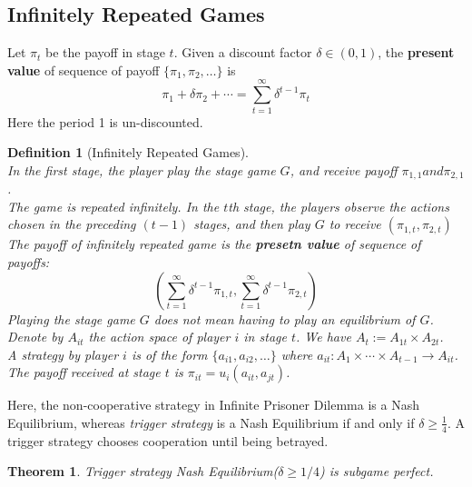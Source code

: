 \documentclass[12pt]{article}
\newtheorem{definition}{Definition}[section]
\newtheorem{theorem}{Theorem}[section]
\theoremstyle{definition}
\begin{document}
\subsection{Infinitely Repeated Games}
Let $\pi_t$ be the payoff in stage $t$. Given a discount factor $\delta\in (0,1)$, the \textbf{present value} of sequence of payoff $\{\pi_1,\pi_2,\ldots\}$ is
\[
\pi_1+\delta\pi_2+\cdots = \sum_{t=1}^\infty \delta^{t-1} \pi_t
\]
Here the period 1 is un-discounted.
\begin{definition}[Infinitely Repeated Games]
\hfill\\\normalfont In the first stage, the player play the stage game $G$, and receive payoff $\pi_{1,1} and \pi_{2,1}$.\\
The game is repeated infinitely. In the $t$th stage, the players observe the actions chosen in the preceding $(t-1)$ stages, and then play $G$ to receive $(\pi_{1,t}, \pi_{2,t})$\\
The payoff of infinitely repeated game is the \textbf{presetn value} of sequence of payoffs:
\[
(\sum_{t=1}^\infty \delta^{t-1}\pi_{1,t}, \sum_{t=1}^\infty \delta^{t-1}\pi_{2,t})
\]
Playing the stage game $G$ does not mean having to play an equilibrium of $G$.\\
Denote by $A_{it}$ the action space of player $i$ in stage $t$. We have $A_t:=A_{1t}\times A_{2t}$.\\
A strategy by player $i$ is of the form $\{a_{i1}, a_{i2},\ldots\}$ where $a_{it}:A_1\times\cdots\times A_{t-1}\to A_{it}$.\\
The payoff received at stage $t$ is $\pi_{it}=u_i(a_{it}, a_{jt})$.
\end{definition}
Here, the non-cooperative strategy in Infinite Prisoner Dilemma is a Nash Equilibrium, whereas \textit{trigger strategy} is a Nash Equilibrium if and only if $\delta\geq \frac{1}{4}$. A trigger strategy chooses cooperation until being betrayed.
\begin{theorem}\normalfont Trigger strategy Nash Equilibrium($\delta\geq 1/4$) is subgame perfect.\end{theorem}
\clearpage
\end{document}
